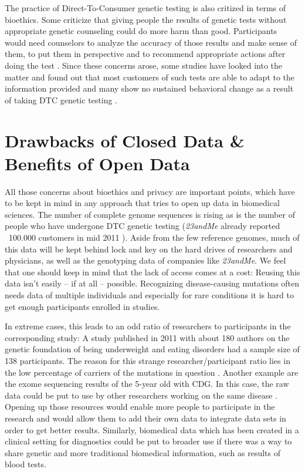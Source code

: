 \documentclass[runningheads,a4paper]{llncs}
\begin{document}
The practice of Direct-To-Consumer genetic testing is also critized in terms of bioethics. Some criticize that giving people the results of genetic tests without appropriate genetic counseling could do more harm than good. Participants would need counselors to analyze the accuracy of those results and make sense of them, to put them in perspective and to recommend appropriate actions after doing the test \cite{norrgard}. Since these concerns arose, some studies have looked into the matter and found out that most customers of such tests are able to adapt to the information provided and many show no sustained behavioral change as a result of taking DTC genetic testing \cite{caulfield}.

\section{Drawbacks of Closed Data \& Benefits of Open Data}

All those concerns about bioethics and privacy are important points, which have to be kept in mind in any approach that tries to open up data in biomedical sciences. The number of complete genome sequences is rising as is the number of people who have undergone DTC genetic testing (\emph{23andMe} already reported ~100.000 customers in mid 2011 \cite{23andme2}). Aside from the few reference genomes, much of this data will be kept behind lock and key on the hard drives of researchers and physicians, as well as the genotyping data of companies like \emph{23andMe}. We feel that one should keep in mind that the lack of access comes at a cost: Reusing this data isn't easily – if at all – possible. Recognizing disease-causing mutations often needs data of multiple individuals and especially for rare conditions it is hard to get enough participants enrolled in studies. 

In extreme cases, this leads to an odd ratio of researchers to participants in the corresponding study: A study published in 2011 with about 180 authors on the genetic foundation of being underweight and eating disorders had a sample size of 138 participants. The reason for this strange researcher/participant ratio lies in the low percentage of carriers of the mutations in question \cite{jacquemont}. Another example are the exome sequencing results of the 5-year old with CDG. In this case, the raw data could be put to use by other researchers working on the same disease \cite{jones}. Opening up those resources would enable more people to participate in the research and would allow them to add their own data to integrate data sets in order to get better results. Similarly, biomedical data which has been created in a clinical setting for diagnostics could be put to broader use if there was a way to share genetic and more traditional biomedical information, such as results of blood tests. 
\end{document}
